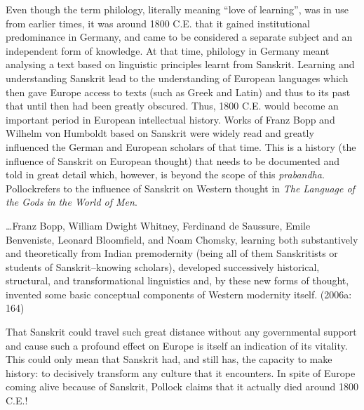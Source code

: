 Even though the term philology, literally meaning “love of learning”, was in use from earlier times, it was around 1800 C.E. that it gained institutional predominance in Germany, and came to be considered a separate subject and an independent form of knowledge. At that time, philology in Germany meant analysing a text based on linguistic principles learnt from Sanskrit. Learning and understanding Sanskrit lead to the understanding of European languages which then gave Europe access to texts (such as Greek and Latin) and thus to its past that until then had been greatly obscured. Thus, 1800 C.E. would become an important period in European intellectual history. Works of Franz Bopp and Wilhelm von Humboldt based on Sanskrit were widely read and greatly influenced the German and European scholars of that time. This is a history (the influence of Sanskrit on European thought) that needs to be documented and told in great detail which, however, is beyond the scope of this \textit{prabandha}. Pollockrefers to the influence of Sanskrit on Western thought in \textit{The Language of the Gods in the World of Men}.

\begin{myquote}
…Franz Bopp, William Dwight Whitney, Ferdinand de Saussure, Emile Benveniste, Leonard Bloomﬁeld, and Noam Chomsky, learning both substantively and theoretically from Indian premodernity (being all of them Sanskritists or students of Sanskrit–knowing scholars), developed successively historical, structural, and transformational linguistics and, by these new forms of thought, invented some basic conceptual components of Western modernity itself. (2006a: 164)
\end{myquote}

That Sanskrit could travel such great distance without any governmental support and cause such a profound effect on Europe is itself an indication of its vitality. This could only mean that Sanskrit had, and still has, the capacity to make history: to decisively transform any culture that it encounters. In spite of Europe coming alive because of Sanskrit, Pollock claims that it actually died around 1800 C.E.!

